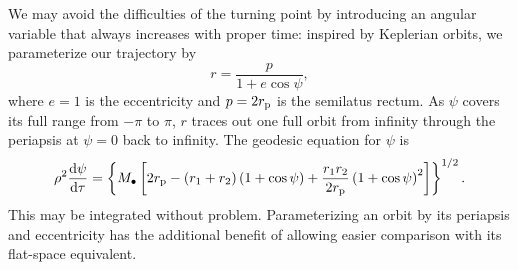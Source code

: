 We may avoid the difficulties of the turning point by introducing an angular variable that always increases with proper time\cite{Drasco2004}: inspired by Keplerian orbits, we parameterize our trajectory by
\begin{equation}
r = \frac{p}{1+e\cos\psi},
\end{equation}
where $e = 1$ is the eccentricity and $p = 2r_\mathrm{p}$ is the semilatus rectum. As $\psi$ covers its full range from $-\pi$ to $\pi$, $r$ traces out one full orbit from infinity through the periapsis at $\psi = 0$ back to infinity. The geodesic equation for $\psi$ is
\begin{equation}
\rho^2 \frac{\mathrm{d} {\psi}}{\mathrm{d} {\tau}} = \left\{M_\bullet\left[2r_\mathrm{p} - \left(r_1 + r_2\right)\left(1 + \cos\psi\right) + \frac{r_1 r_2}{2r_\mathrm{p}}\left(1 + \cos\psi\right)^2\right]\right\}^{1/2}.
\end{equation}
This may be integrated without problem. Parameterizing an orbit by its periapsis and eccentricity has the additional benefit of allowing easier comparison with its flat-space equivalent\cite{Gair2005}.

